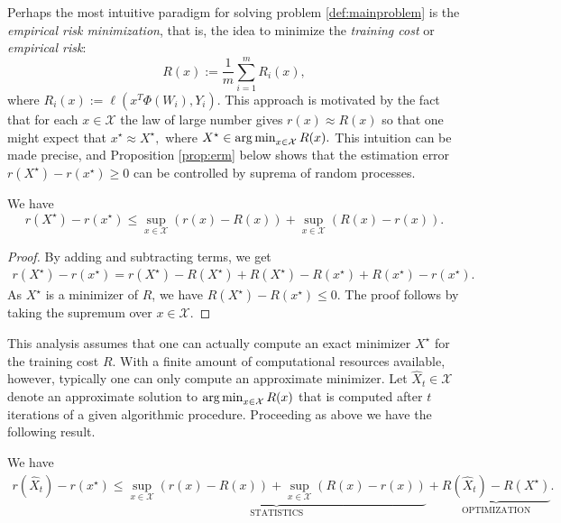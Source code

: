 Perhaps the most intuitive paradigm for solving problem \eqref{def:mainproblem} is the \emph{empirical risk minimization}, that is, the idea to minimize the \emph{training cost} or \emph{empirical risk}:
$$
	R(x) := \frac{1}{m} \sum_{i=1}^m R_i(x),
$$
where $R_i(x) := \ell(x^T\Phi(W_i),Y_i)$.
This approach is motivated by the fact that for each $x\in\mathcal{X}$ the law of large number gives
$
	r(x) \approx R(x)
$
so that one might expect that
$
	x^\star \approx X^\star,
$
where
$
	X^\star \in \operatorname*{arg\,min}_{x\in\mathcal{X}} R(x).
$
This intuition can be made precise, and Proposition \ref{prop:erm} below shows that the estimation error $r(X^\star) - r(x^\star) \ge 0$ can be controlled by suprema of random processes.

\begin{proposition}
\label{prop:erm}
We have
$$
	r(X^\star) - r(x^\star)
	\le
	\sup_{x\in\mathcal{X}} ( r(x) - R(x) ) + \sup_{x\in\mathcal{X}} ( R(x) - r(x) ).
$$
\end{proposition}

\begin{proof}
By adding and subtracting terms, we get
\begin{align*}
	r(X^\star) - r(x^\star)
	= r(X^\star) - R(X^\star) + R(X^\star) - R(x^\star) + R(x^\star) - r(x^\star).
\end{align*}
As $X^\star$ is a minimizer of $R$, we have $R(X^\star) - R(x^\star) \le 0$. The proof follows by taking the supremum over $x\in\mathcal{X}$.
\end{proof}

This analysis assumes that one can actually compute an exact minimizer $X^\star$ for the training cost $R$. With a finite amount of computational resources available, however, typically one can only compute an approximate minimizer. Let $\hat X_t\in\mathcal{X}$ denote an approximate solution to $\operatorname*{arg\,min}_{x\in\mathcal{X}} R(x)$ that is computed after $t$ iterations of a given algorithmic procedure. Proceeding as above we have the following result.

\begin{proposition}
\label{prop:erm2}
We have
\begin{align}
	r(\hat X_t) - r(x^\star)
	\le
	\underbrace{\sup_{x\in\mathcal{X}} ( r(x) - R(x) ) + \sup_{x\in\mathcal{X}} ( R(x) - r(x) )}_{\textrm{STATISTICS}}
	+
	\underbrace{R(\hat X_t) - R(X^\star)}_{\textrm{OPTIMIZATION}}.
	\label{bound:stats-opt}
\end{align}
\end{proposition}

